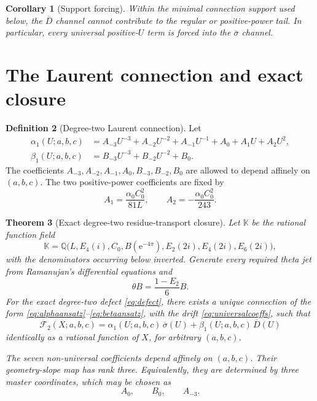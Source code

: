 \documentclass[11pt]{article}
\newtheorem{theorem}{Theorem}[section]
\newtheorem{corollary}[theorem]{Corollary}
\theoremstyle{definition}
\newtheorem{definition}[theorem]{Definition}
\theoremstyle{remark}
\newcommand{\e}{\mathrm{e}}
\newcommand{\Q}{\mathbb{Q}}
\newcommand{\Kfield}{\mathbb{K}}
\newcommand{\bsigma}{\overline{\sigma}}
\newcommand{\bD}{\overline{D}}
\begin{document}
\begin{corollary}[Support forcing]\label{cor:supportforcing}
Within the minimal connection support used below, the $\bD$ channel cannot contribute to the regular or positive-power tail.  In particular, every universal positive-$U$ term is forced into the $\bsigma$ channel.
\end{corollary}

\section{The Laurent connection and exact closure}

\begin{definition}[Degree-two Laurent connection]\label{def:connection}
Let
\begin{align}
 \alpha_1(U;a,b,c)
 &={A_{-3}}U^{-3}+{A_{-2}}U^{-2}+{A_{-1}}U^{-1}+A_0+A_1U+A_2U^2,
 \label{eq:alphaansatz}\\
 \beta_1(U;a,b,c)
 &={B_{-3}}U^{-3}+{B_{-2}}U^{-2}+B_0.
 \label{eq:betaansatz}
\end{align}
The coefficients $A_{-3},A_{-2},A_{-1},A_0,B_{-3},B_{-2},B_0$ are allowed to depend affinely on $(a,b,c)$.  The two positive-power coefficients are fixed by
\begin{equation}\label{eq:universalcoeffs}
 A_1=\frac{\alpha_0C_0^2}{81L},
 \qquad
 A_2=-\frac{\alpha_0C_0^2}{243}.
\end{equation}
\end{definition}

\begin{theorem}[Exact degree-two residue-transport closure]\label{thm:main}
Let $\Kfield$ be the rational function field
\begin{equation}\label{eq:field}
 \Kfield=
 \Q\bigl(
 L,E_4(i),C_0,B(\e^{-4\pi}),E_2(2i),E_4(2i),E_6(2i)
 \bigr),
\end{equation}
with the denominators occurring below inverted.  Generate every required theta jet from Ramanujan's differential equations and
\[
 \theta B=\frac{1-E_2}{6}B.
\]
For the exact degree-two defect \eqref{eq:defect}, there exists a unique connection of the form \eqref{eq:alphaansatz}--\eqref{eq:betaansatz}, with the drift \eqref{eq:universalcoeffs}, such that
\begin{equation}\label{eq:mainidentity}
 \boxed{
 \mathscr F_2(X;a,b,c)
 =\alpha_1(U;a,b,c)\,\bsigma(U)
 +\beta_1(U;a,b,c)\,\bD(U)
 }
\end{equation}
identically as a rational function of $X$, for arbitrary $(a,b,c)$.

The seven non-universal coefficients depend affinely on $(a,b,c)$.  Their geometry-slope map has rank three.  Equivalently, they are determined by three master coordinates, which may be chosen as
\begin{equation}\label{eq:masters}
 A_0,
 \qquad B_0,
 \qquad A_{-3}.
\end{equation}
\end{theorem}
\end{document}
